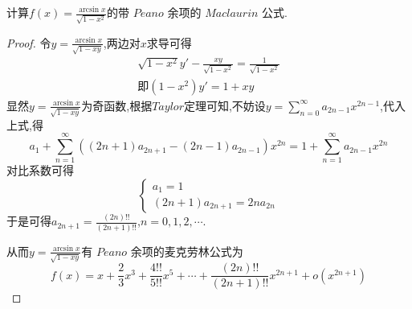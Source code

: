 \documentclass[lang=cn,newtx,10pt,scheme=chinese]{../Template/elegantbook}
\begin{document}
\begin{exercise}
    计算$f(x)=\frac{\arcsin x}{\sqrt{1-x^2}}$的带 $Peano$ 余项的 $Maclaurin$ 公式.
    \begin{proof}
    令\(y=\frac{\arcsin x}{\sqrt{1 - xy}}\),两边对\(x\)求导可得
    \begin{gather}
    \sqrt{1 - x^{2}}y'-\frac{xy}{\sqrt{1 - x^{2}}}=\frac{1}{\sqrt{1-x^2}}
    \nonumber\\
    \text{即}(1 - x^{2})y' = 1 + xy
    \nonumber
    \end{gather}
    显然$y=\frac{\arcsin x}{\sqrt{1 - xy}}$为奇函数,根据$Taylor$定理可知,不妨设\(y=\sum_{n = 0}^{\infty}a_{2n-1}x^{2n-1}\),代入上式,得
    \begin{equation}
    a_{1}+\sum_{n = 1}^{\infty}\left((2n + 1)a_{2n + 1}-(2n - 1)a_{2n - 1}\right)x^{2n}=1+\sum_{n = 1}^{\infty}a_{2n - 1}x^{2n}
    \nonumber
    \end{equation}
    对比系数可得
    \begin{equation}
    \begin{cases}a_{1}=1\\(2n + 1)a_{2n + 1}=2na_{2n}\end{cases}
    \nonumber
    \end{equation}
    于是可得\(a_{2n + 1}=\frac{(2n)!!}{(2n + 1)!!}\),\(n = 0,1,2,\cdots\).
    
    从而\(y=\frac{\arcsin x}{\sqrt{1 - xy}}\)有 $Peano$ 余项的麦克劳林公式为
    \begin{equation}
         f(x)=x+\frac{2}{3}x^{3}+\frac{4!!}{5!!}x^{5}+\cdots+\frac{(2n)!!}{(2n + 1)!!}x^{2n + 1}+o(x^{2n + 1})
        \nonumber
    \end{equation}    
    \end{proof}
\end{exercise}
\end{document}
